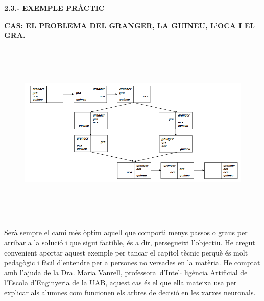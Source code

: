 \documentclass[12pt]{article}
\begin{document}
\vspace{\baselineskip}
\textbf{2.3.- EXEMPLE PRÀCTIC}\par


\vspace{\baselineskip}
\begin{justify}
\textbf{CAS: EL PROBLEMA DEL GRANGER, LA GUINEU, L’OCA I EL GRA. }
\end{justify}\par




\begin{figure}[H]
\advance\leftskip -0.96in		\includegraphics[width=7.57in,height=3.48in]{./media/image3.png}
\end{figure}



\par


\vspace{\baselineskip}
\begin{justify}
Serà sempre el camí més òptim aquell que comporti menys passos o graus per arribar a la solució i que sigui factible, és a dir, persegueixi l’objectiu. He cregut convenient aportar aquest exemple per tancar el capítol tècnic perquè és molt pedagògic i fàcil d’entendre per a persones no versades en la matèria. He comptat amb l’ajuda de la Dra. Maria Vanrell, professora\ d’Intel$ \cdot $ ligència Artificial de l’Escola d’Enginyeria de la UAB,  aquest cas és el que ella mateixa usa per explicar als alumnes com funcionen els arbres de decisió en les xarxes neuronals.
\end{justify}\par
\end{document}
